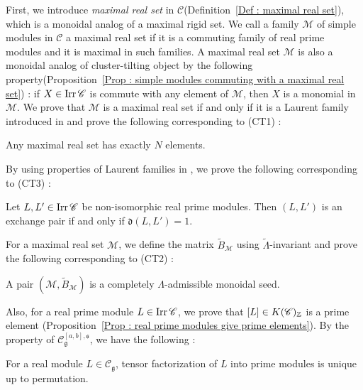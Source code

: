 First, we introduce \emph{maximal real set} in $\mathscr{C}$(Definition~\ref{Def : maximal real set}), 
which is a monoidal analog of a maximal rigid set. 
We call a family $\mathcal{M}$ of simple modules in $\mathscr{C}$ a maximal real set 
if it is a commuting family of real prime modules and it is maximal in such families. 
A maximal real set $\mathcal{M}$ is also a monoidal analog of cluster-tilting object 
by the following property(Proposition~\ref{Prop : simple modules commuting with a maximal real set}) : 
 if $X \in \mathop{\mathrm{Irr}}\nolimits \mathscr{C}$ is commute with any element of $\mathcal{M}$, 
then $X$ is a monomial in $\mathcal{M}$. 
We prove that $\mathcal{M}$ is a maximal real set if and only if it is a Laurent family introduced in 
\cite{Laurentfamily} and prove the following corresponding to (CT1) : 
\begin{Thm}
  Any maximal real set has exactly $N$ elements. 
\end{Thm}
By using properties of Laurent families in \cite{KK19, Laurentfamily}, 
we prove the following corresponding to (CT3) : 
\begin{Thm}
Let $L, L' \in \mathop{\mathrm{Irr}}\nolimits\mathscr{C}$ be non-isomorphic real prime modules.
Then $(L, L')$ is an exchange pair if and only if
$\mathfrak{d}(L, L') = 1$.
\end{Thm}
For a maximal real set $\mathcal{M}$, 
we define the matrix $\widetilde B_{\mathcal M}$ using $\widetilde{\Lambda}$-invariant and 
prove the following corresponding to (CT2) : 
\begin{Thm}
  A pair $(\mathcal{M}, \widetilde{B}_{\mathcal{M}})$ is a completely
$\Lambda$-admissible monoidal seed.
\end{Thm}
Also, for a real prime module $L \in \mathop{\mathrm{Irr}}\nolimits\mathscr{C}$, 
we prove that $[L] \in K(\mathscr{C})_{\mathbb{Z}}$ is a prime element
(Proposition~\ref{Prop : real prime modules give prime elements}). 
By the property of $\mathscr{C}_{\mathfrak{g}}^{[a, b], \mathfrak{s}}$, 
we have the following : 
\begin{Thm}
For a real module $L \in \mathscr{C}_{\mathfrak{g}}$,
tensor factorization of $L$ into prime modules
is unique up to permutation.
\end{Thm}



